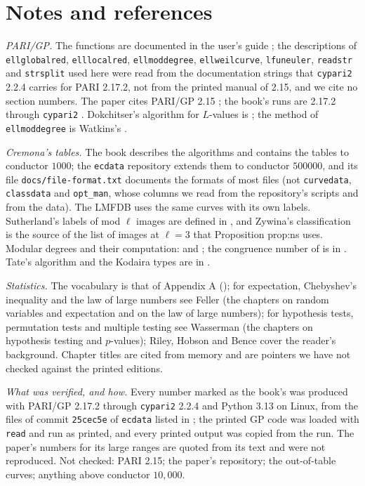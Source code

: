 \begin{sloppypar}
\section{Notes and references}\label{sec:computation:notes}

\emph{PARI/GP.} The functions are documented in the user's guide \cite{PARIusers}; the descriptions of \texttt{ellglobalred}, \texttt{elllocalred},
\texttt{ellmoddegree}, \texttt{ellweilcurve}, \texttt{lfuneuler}, \texttt{readstr} and \texttt{strsplit} used here were read from the documentation strings that
\texttt{cypari2} 2.2.4 carries for PARI 2.17.2, not from the printed manual of 2.15, and we cite no section numbers. The paper cites PARI/GP 2.15 \cite{PARI};
the book's runs are 2.17.2 \cite{PARI217} through \texttt{cypari2} \cite{cypari2}. Dokchitser's algorithm for $L$-values is \cite{Dokchitser04}; the method of
\texttt{ellmoddegree} is Watkins's \cite{Watkins02}.

\emph{Cremona's tables.} The book \cite{Cremona97} describes the algorithms and contains the tables to conductor $1000$; the \texttt{ecdata} repository
\cite{ecdata} extends them to conductor $500000$, and its file \texttt{docs/\allowbreak file-format.txt} documents the formats of most files (not
\texttt{curvedata}, \texttt{classdata} and \texttt{opt\_man}, whose columns we read from the repository's scripts and from the data). The LMFDB \cite{LMFDB} uses
the same curves with its own labels. Sutherland's labels of mod $\ell$ images are defined in \cite{Sutherland16}, and Zywina's classification \cite{Zywina15} is
the source of the list of images at $\ell=3$ that Proposition prop:ns uses. Modular degrees and their computation: \cite{Zagier85,Watkins02} and
\cite[Chapter II]{Cremona97}; the congruence number of  is in \cite[Table 1]{ARS12}. Tate's algorithm and the Kodaira types are in
\cite[Chapter IV]{SilvermanATAEC}.

\emph{Statistics.} The vocabulary is that of Appendix A (); for expectation, Chebyshev's inequality and the law of large numbers see
Feller \cite{Feller68} (the chapters on random variables and expectation and on the law of large numbers); for hypothesis tests, permutation tests and
multiple testing see Wasserman \cite{Wasserman04} (the chapters on hypothesis testing and $p$-values); Riley, Hobson and Bence \cite{RHB06} cover the
reader's background. Chapter titles are cited from memory and are pointers we have not checked against the printed editions.

\emph{What was verified, and how.} Every number marked as the book's was produced with PARI/GP 2.17.2 through \texttt{cypari2} 2.2.4 and Python 3.13 on
Linux, from the files of commit \texttt{25cec5e} of \texttt{ecdata} listed in ; the printed GP code was loaded with
\texttt{read} and run as printed, and every printed output was copied from the run. The paper's numbers for its large ranges are quoted from its text
and were not reproduced. Not checked: PARI 2.15; the paper's repository; the out-of-table curves; anything above conductor $10{,}000$.


\end{sloppypar}
